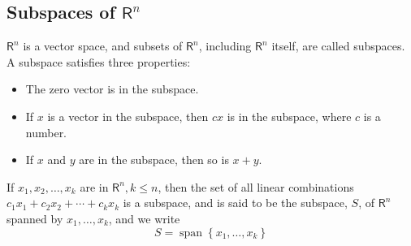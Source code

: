 \documentclass[../main.tex]{subfiles}
\begin{document}
\subsection*{Subspaces of $\mathsf{R}^{n}$}
$\mathsf{R}^{n}$ is a vector space, and subsets of $\mathsf{R}^{n}$, including $\mathsf{R}^{n}$ itself, are called subspaces. A subspace satisfies three properties:

\begin{itemize}[noitemsep]

\item The zero vector is in the subspace.

\item If $x$ is a vector in the subspace, then $c x$ is in the subspace, where $c$ is a number.

\item If $x$ and $y$ are in the subspace, then so is $x+y$.
\end{itemize}
If $x_{1}, x_{2}, \ldots, x_{k}$ are in $\mathsf{R}^{n}, k \leq n$, then the set of all linear combinations $c_{1} x_{1}+c_{2} x_{2}+\cdots+c_{k} x_{k}$ is a subspace, and is said to be the subspace, $S$, of $\mathsf{R}^{n}$ spanned by $x_{1}, \ldots, x_{k}$, and we write
$$S=\operatorname{span}\left\{x_{1}, \ldots, x_{k}\right\}$$
\end{document}
